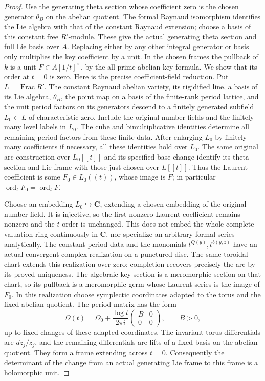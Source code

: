 \begin{proof}
Use the generating theta section whose coefficient zero is the
chosen generator $\theta_B$ on the abelian quotient.  The formal
Raynaud isomorphism identifies the Lie algebra with that of the
constant Raynaud extension; choose a basis of this constant free
$R'$-module.  These give the actual generating theta section and
full Lie basis over $A$.  Replacing either by any other integral
generator or basis only multiplies the key coefficient by a unit.
In the chosen frames the pullback
of $k$ is a unit $F\in A[1/t]^\times$, by the all-prime abelian
key formula.  We show that its order at $t=0$ is zero.
Here is the precise coefficient-field reduction.  Put
$L=\operatorname{Frac}R'$.  The constant Raynaud abelian variety,
its rigidified line, a basis of its Lie algebra, $\theta_B$, the
point map on a basis of the finite-rank period lattice, and the
unit period factors on its generators descend to a finitely
generated subfield $L_0\subset L$ of characteristic zero.  Include
the original number fields and the finitely many level labels in
$L_0$.  The cube and bimultiplicative identities determine all
remaining period factors from these finite data.  After enlarging
$L_0$ by finitely many coefficients if necessary, all these
identities hold over $L_0$.  The same original arc construction over
$L_0[[t]]$ and its specified base change identify its theta section
and Lie frame with those just chosen over $L[[t]]$.  Thus the
Laurent coefficient is some $F_0\in L_0((t))$, whose image is $F$;
in particular $\operatorname{ord}_tF_0=\operatorname{ord}_tF$.

Choose an embedding $L_0\hookrightarrow\mathbf C$, extending a
chosen embedding of the original number field.  It is injective,
so the first nonzero Laurent coefficient remains nonzero and the
$t$-order is unchanged.  This does not embed the whole complete
valuation ring continuously in $\mathbf C$, nor specialize an
arbitrary formal series analytically.  The constant period data
and the monomials $t^{Q(y)},t^{b(y,z)}$ have an actual convergent
complex realization on a punctured disc.  The same toroidal chart
extends this realization over zero; completion recovers precisely
the arc by its proved uniqueness.  The algebraic key section is
a meromorphic section on that chart, so its pullback is a
meromorphic germ whose Laurent series is the image of $F_0$.
In this realization choose symplectic
coordinates adapted to the torus and the fixed abelian quotient.
The period matrix has the form
\[
        \Omega(t)=\Omega_0+
             \frac{\log t}{2\pi i}
                  \begin{pmatrix}B&0\\0&0\end{pmatrix},
                      \qquad B>0,
\]
up to fixed changes of these adapted coordinates.  The invariant
torus differentials are $dz_j/z_j$, and the remaining differentials
are lifts of a fixed basis on the abelian quotient.  They form a
frame extending across $t=0$.  Consequently the determinant of
the change from an actual generating Lie frame to this frame is
a holomorphic unit.


\end{proof}

